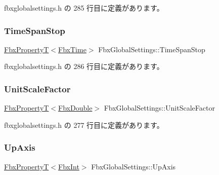  fbxglobalsettings.\+h の 285 行目に定義があります。

\mbox{\label{class_fbx_global_settings_a4f60466f7d9a757dcf3bf50d22701846}} 
\subsubsection{\texorpdfstring{Time\+Span\+Stop}{TimeSpanStop}}
{\footnotesize\ttfamily \hyperlink{class_fbx_property_t}{Fbx\+PropertyT}$<$\hyperlink{class_fbx_time}{Fbx\+Time}$>$ Fbx\+Global\+Settings\+::\+Time\+Span\+Stop\hspace{0.3cm}{\ttfamily [protected]}}



 fbxglobalsettings.\+h の 286 行目に定義があります。

\mbox{\label{class_fbx_global_settings_a48b74d9a08238419a74fd748000ed7bd}} 
\subsubsection{\texorpdfstring{Unit\+Scale\+Factor}{UnitScaleFactor}}
{\footnotesize\ttfamily \hyperlink{class_fbx_property_t}{Fbx\+PropertyT}$<$\hyperlink{fbxtypes_8h_a171e72a1c46fc15c1a6c9c31948c1c5b}{Fbx\+Double}$>$ Fbx\+Global\+Settings\+::\+Unit\+Scale\+Factor\hspace{0.3cm}{\ttfamily [protected]}}



 fbxglobalsettings.\+h の 277 行目に定義があります。

\mbox{\label{class_fbx_global_settings_a58ba7d81b79cba1243bfb4103b00f4f4}} 
\subsubsection{\texorpdfstring{Up\+Axis}{UpAxis}}
{\footnotesize\ttfamily \hyperlink{class_fbx_property_t}{Fbx\+PropertyT}$<$\hyperlink{fbxtypes_8h_a088fa96de3b0b3ea69f0f6afef525dfb}{Fbx\+Int}$>$ Fbx\+Global\+Settings\+::\+Up\+Axis\hspace{0.3cm}{\ttfamily [protected]}}



